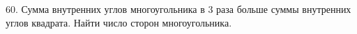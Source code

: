 60. Сумма внутренних углов многоугольника в 3 раза больше суммы внутренних углов квадрата. Найти число сторон многоугольника.\\
